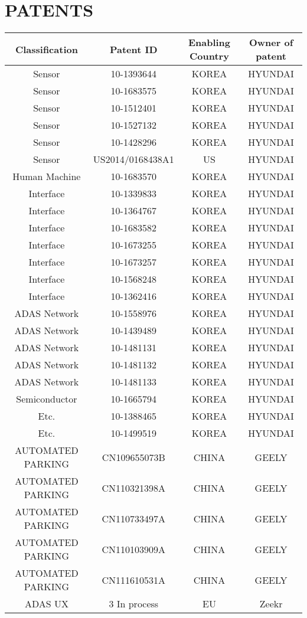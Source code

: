 \documentclass[12pt,a4paper]{article}
\begin{document}
\section{PATENTS}
\begin{tabular}
{c | c | c | c}
Classification & Patent ID & Enabling Country & Owner of patent \\
\hline
Sensor & 10-1393644 & KOREA & HYUNDAI \\
Sensor & 10-1683575 & KOREA & HYUNDAI \\
Sensor & 10-1512401 & KOREA & HYUNDAI \\
Sensor & 10-1527132 & KOREA & HYUNDAI \\
Sensor & 10-1428296 & KOREA & HYUNDAI \\
Sensor & US2014/0168438A1 & US & HYUNDAI \\
Human Machine & 10-1683570 & KOREA & HYUNDAI \\
Interface & 10-1339833 & KOREA & HYUNDAI \\
Interface & 10-1364767 & KOREA & HYUNDAI \\
Interface & 10-1683582 & KOREA & HYUNDAI \\
Interface & 10-1673255 & KOREA & HYUNDAI \\
Interface & 10-1673257 & KOREA & HYUNDAI \\
Interface & 10-1568248 & KOREA & HYUNDAI \\
Interface & 10-1362416 & KOREA & HYUNDAI \\
ADAS Network & 10-1558976 & KOREA & HYUNDAI \\
ADAS Network & 10-1439489 & KOREA & HYUNDAI \\
ADAS Network & 10-1481131 & KOREA & HYUNDAI \\
ADAS Network & 10-1481132 & KOREA & HYUNDAI \\
ADAS Network & 10-1481133 & KOREA & HYUNDAI \\
Semiconductor & 10-1665794 & KOREA & HYUNDAI \\
Etc. & 10-1388465 & KOREA & HYUNDAI \\
Etc. & 10-1499519 & KOREA & HYUNDAI \\
AUTOMATED PARKING & CN109655073B & CHINA & GEELY \\
AUTOMATED PARKING & CN110321398A & CHINA & GEELY \\
AUTOMATED PARKING & CN110733497A & CHINA & GEELY \\
AUTOMATED PARKING & CN110103909A & CHINA & GEELY \\
AUTOMATED PARKING & CN111610531A & CHINA & GEELY \\
ADAS UX & 3 In process & EU & Zeekr \\
\end{tabular}
\end{document}

